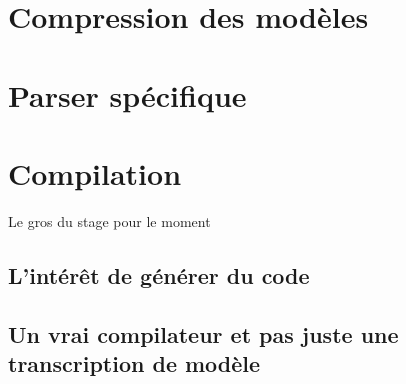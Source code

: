 \section{Compression des modèles}

\section{Parser spécifique}

\section{Compilation}

Le gros du stage pour le moment

\subsection{L'intérêt de générer du code}

\subsection{Un vrai compilateur et pas juste une transcription de modèle}